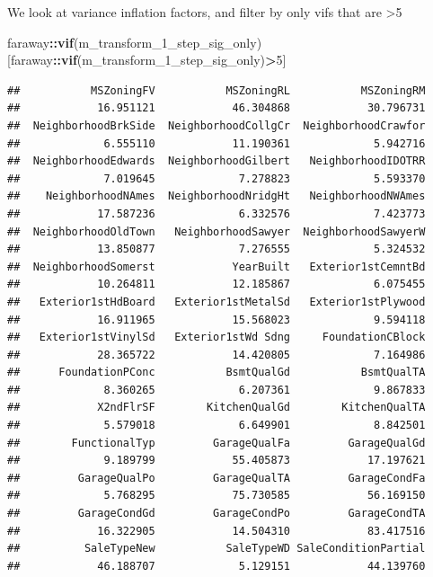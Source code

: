 \documentclass[
]{article}
\newenvironment{Shaded}{\begin{snugshade}}{\end{snugshade}}
\newcommand{\DecValTok}[1]{\textcolor[rgb]{0.00,0.00,0.81}{#1}}
\newcommand{\KeywordTok}[1]{\textcolor[rgb]{0.13,0.29,0.53}{\textbf{#1}}}
\newcommand{\NormalTok}[1]{#1}
\newcommand{\OperatorTok}[1]{\textcolor[rgb]{0.81,0.36,0.00}{\textbf{#1}}}
\begin{document}
We look at variance inflation factors, and filter by only vifs that are \textgreater5

\begin{Shaded}
\begin{Highlighting}[]
\NormalTok{faraway}\OperatorTok{::}\KeywordTok{vif}\NormalTok{(m_transform_}\DecValTok{1}\NormalTok{_step_sig_only)[faraway}\OperatorTok{::}\KeywordTok{vif}\NormalTok{(m_transform_}\DecValTok{1}\NormalTok{_step_sig_only)}\OperatorTok{>}\DecValTok{5}\NormalTok{]}
\end{Highlighting}
\end{Shaded}

\begin{verbatim}
##           MSZoningFV           MSZoningRL           MSZoningRM 
##            16.951121            46.304868            30.796731 
##  NeighborhoodBrkSide  NeighborhoodCollgCr  NeighborhoodCrawfor 
##             6.555110            11.190361             5.942716 
##  NeighborhoodEdwards  NeighborhoodGilbert   NeighborhoodIDOTRR 
##             7.019645             7.278823             5.593370 
##    NeighborhoodNAmes  NeighborhoodNridgHt   NeighborhoodNWAmes 
##            17.587236             6.332576             7.423773 
##  NeighborhoodOldTown   NeighborhoodSawyer  NeighborhoodSawyerW 
##            13.850877             7.276555             5.324532 
##  NeighborhoodSomerst            YearBuilt   Exterior1stCemntBd 
##            10.264811            12.185867             6.075455 
##   Exterior1stHdBoard   Exterior1stMetalSd   Exterior1stPlywood 
##            16.911965            15.568023             9.594118 
##   Exterior1stVinylSd   Exterior1stWd Sdng     FoundationCBlock 
##            28.365722            14.420805             7.164986 
##      FoundationPConc           BsmtQualGd           BsmtQualTA 
##             8.360265             6.207361             9.867833 
##            X2ndFlrSF        KitchenQualGd        KitchenQualTA 
##             5.579018             6.649901             8.842501 
##        FunctionalTyp         GarageQualFa         GarageQualGd 
##             9.189799            55.405873            17.197621 
##         GarageQualPo         GarageQualTA         GarageCondFa 
##             5.768295            75.730585            56.169150 
##         GarageCondGd         GarageCondPo         GarageCondTA 
##            16.322905            14.504310            83.417516 
##          SaleTypeNew           SaleTypeWD SaleConditionPartial 
##            46.188707             5.129151            44.139760
\end{verbatim}
\end{document}
